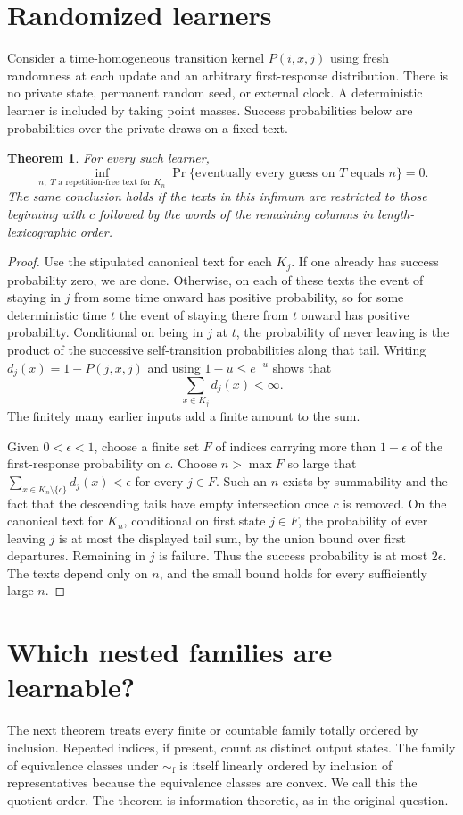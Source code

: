 \documentclass[11pt]{article}
\newtheorem{theorem}{Theorem}
\newcommand{\simf}{\mathrel{\sim_{\mathrm f}}}
\begin{document}
\section{Randomized learners}
Consider a time-homogeneous transition kernel $P(i,x,j)$ using fresh randomness at each update and an arbitrary first-response distribution. There is no private state, permanent random seed, or external clock. A deterministic learner is included by taking point masses. Success probabilities below are probabilities over the private draws on a fixed text.
\begin{theorem}\label{random}
For every such learner,
\[
 \inf_{n,\;T\text{ a repetition-free text for } K_n}
   \Pr\{\text{eventually every guess on }T\text{ equals }n\}=0 .
\]
The same conclusion holds if the texts in this infimum are restricted to those beginning with $c$ followed by the words of the remaining columns in length-lexicographic order.
\end{theorem}
\begin{proof}
Use the stipulated canonical text for each $K_j$. If one already has success probability zero, we are done. Otherwise, on each of these texts the event of staying in $j$ from some time onward has positive probability, so for some deterministic time $t$ the event of staying there from $t$ onward has positive probability. Conditional on being in $j$ at $t$, the probability of never leaving is the product of the successive self-transition probabilities along that tail. Writing $d_j(x)=1-P(j,x,j)$ and using $1-u\le e^{-u}$ shows that
\[
                \sum_{x\in K_j} d_j(x)<\infty .
\]
The finitely many earlier inputs add a finite amount to the sum.

Given $0<\epsilon<1$, choose a finite set $F$ of indices carrying more than $1-\epsilon$ of the first-response probability on $c$. Choose $n>\max F$ so large that $\sum_{x\in K_n\setminus\{c\}}d_j(x)<\epsilon$ for every $j\in F$. Such an $n$ exists by summability and the fact that the descending tails have empty intersection once $c$ is removed. On the canonical text for $K_n$, conditional on first state $j\in F$, the probability of ever leaving $j$ is at most the displayed tail sum, by the union bound over first departures. Remaining in $j$ is failure. Thus the success probability is at most $2\epsilon$. The texts depend only on $n$, and the small bound holds for every sufficiently large $n$.
\end{proof}

\section{Which nested families are learnable?}
The next theorem treats every finite or countable family totally ordered by inclusion. Repeated indices, if present, count as distinct output states. The family of equivalence classes under $\simf$ is itself linearly ordered by inclusion of representatives because the equivalence classes are convex. We call this the quotient order. The theorem is information-theoretic, as in the original question.
\end{document}
